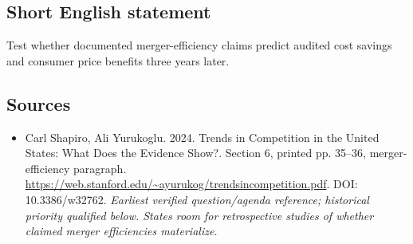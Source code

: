\documentclass[11pt]{article}
\begin{document}
\subsection{Short English statement}
Test whether documented merger-efficiency claims predict audited cost savings and consumer price benefits three years later.

\subsection{Sources}
\begin{itemize}\raggedright
\item[\textnormal{[S1]}]\hypertarget{source:30007676:1}{} Carl Shapiro, Ali Yurukoglu. 2024. Trends in Competition in the United States: What Does the Evidence Show?. Section 6, printed pp. 35–36, merger-efficiency paragraph.
\url{https://web.stanford.edu/~ayurukog/trendsincompetition.pdf}.
DOI: 10.3386/w32762.
{\small\textit{Earliest verified question/agenda reference; historical priority qualified below. States room for retrospective studies of whether claimed merger efficiencies materialize.}}
\end{itemize}
\end{document}

